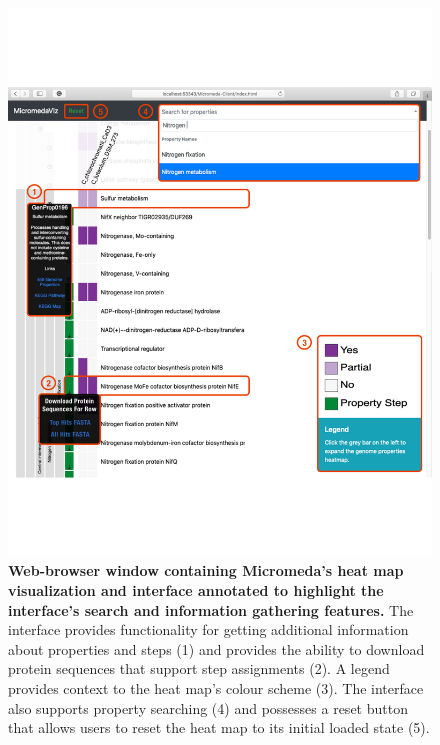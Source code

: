 \begin{figure}[!ht]
  \centering
	\includegraphics[width=\textwidth]{media/micromeda-interface.pdf}
	 \caption[Web-browser window containing Micromeda’s heat map visualization and 
interface annotated to highlight the interface’s search and information 
gathering features.]{\textbf{Web-browser window containing Micromeda’s heat map 
visualization and interface annotated to highlight the interface’s search and 
information gathering features.} The interface provides functionality for getting 
additional information about properties and steps (1) and provides the ability 
to download protein sequences that support step assignments (2). A legend 
provides context to the heat map’s colour scheme (3). The interface also 
supports property searching (4) and possesses a reset button that allows users 
to reset the heat map to its initial loaded state (5).}
	 \label{fig:micromeda-interface}
\end{figure}

